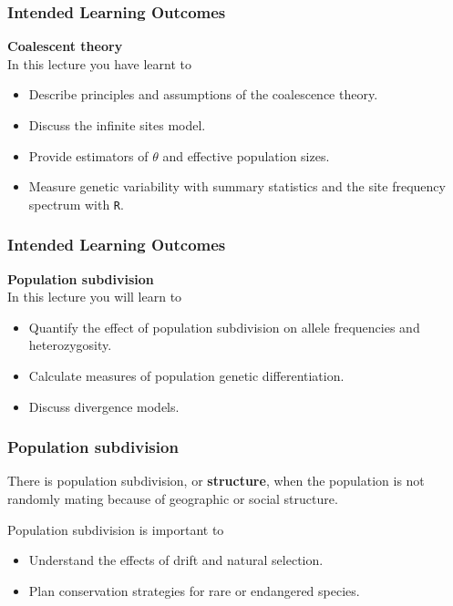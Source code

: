 \documentclass{beamer}
\newcommand{\1}{\ensuremath{\mathbf{1}}}
\begin{document}
%
%
%
\begin{frame}\frametitle{Intended Learning Outcomes}
	\textbf{Coalescent theory}\\[2ex]
	In this lecture you have learnt to
	\begin{itemize}
		\item Describe principles and assumptions of the coalescence theory.
		\item Discuss the infinite sites model.
		\item Provide estimators of $\theta$ and effective population sizes.
		\item Measure genetic variability with summary statistics and the site frequency spectrum with \texttt{R}.
	\end{itemize}
\end{frame}
%
%
%
\begin{frame}\frametitle{Intended Learning Outcomes}
	\textbf{Population subdivision}\\[2ex]
	In this lecture you will learn to
	\begin{itemize}
		\item Quantify the effect of population subdivision on allele frequencies and heterozygosity.
		\item Calculate measures of population genetic differentiation.
		\item Discuss divergence models.
	\end{itemize}
\end{frame}
%
%
%
\begin{frame}\frametitle{Population subdivision}
	\begin{block}{}
		There is population subdivision, or \textbf{structure}, when the population is not randomly mating because of geographic or social structure.
	\end{block}
	Population subdivision is important to
	\begin{itemize}
		\item Understand the effects of drift and natural selection.
		\item Plan conservation strategies for rare or endangered species.
	\end{itemize}
\end{frame}
\end{document}
